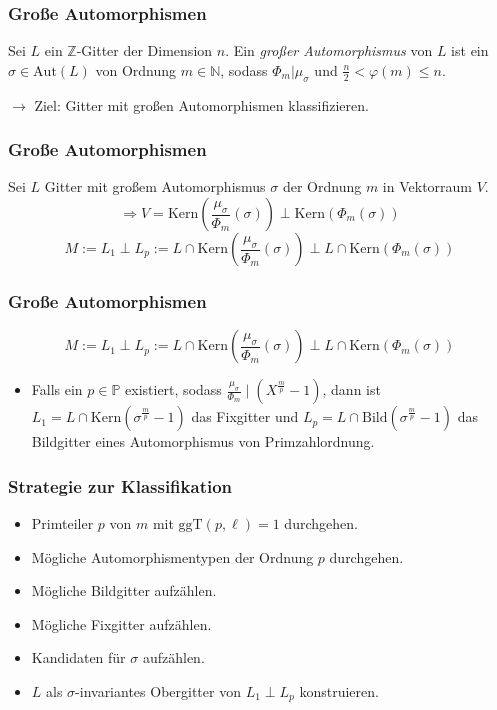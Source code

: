 \documentclass{beamer}
\newcommand{\N}{\mathbb{N}}
\newcommand{\Z}{\mathbb{Z}}
\renewcommand{\P}{\mathbb{P}}
\newcommand{\Kern}{\text{Kern}}
\newcommand{\Bild}{\text{Bild}}
\newcommand{\ggT}{\text{ggT}}
\newcommand{\Aut}{\text{Aut}}
\begin{document}
\begin{frame}[plain]
	\frametitle{Große Automorphismen}
	\begin{Definition}
		Sei $L$ ein $\Z$-Gitter der Dimension $n$. Ein \textit{großer Automorphismus} von $L$ ist ein $\sigma \in \Aut(L)$ von Ordnung $m \in \N$, sodass $\Phi_m \vert \mu_\sigma$ und $\frac{n}{2} < \varphi(m) \leq n$.
	\end{Definition}
	\pause
	\par
	$\rightarrow$ Ziel: Gitter mit großen Automorphismen klassifizieren.
\end{frame}

\begin{frame}[plain]
	\frametitle{Große Automorphismen}
	Sei $L$ Gitter mit großem Automorphismus $\sigma$ der Ordnung $m$ in Vektorraum $V$.
	\pause
	\[\Rightarrow V = \Kern(\frac{\mu_\sigma}{\Phi_m}(\sigma)) \perp \Kern(\Phi_m(\sigma))\]
	\[ M := L_1 \perp L_p := L \cap \Kern(\frac{\mu_\sigma}{\Phi_m}(\sigma)) \perp L \cap \Kern(\Phi_m(\sigma))\]
\end{frame}

\begin{frame}[plain]
	\frametitle{Große Automorphismen}
	\[ M := L_1 \perp L_p := L \cap \Kern(\frac{\mu_\sigma}{\Phi_m}(\sigma)) \perp L \cap \Kern(\Phi_m(\sigma))\]
	\begin{itemize}
		\item Falls ein $p \in \P$ existiert, sodass $\frac{\mu_\sigma}{\Phi_m} \mid (X^\frac{m}{p} - 1)$, dann ist $L_1 = L \cap \Kern(\sigma^\frac{m}{p}-1)$ das Fixgitter und $L_p = L \cap \Bild(\sigma^\frac{m}{p} - 1)$ das Bildgitter eines Automorphismus von Primzahlordnung.
	\end{itemize}
\end{frame}

\begin{frame}[plain]
	\frametitle{Strategie zur Klassifikation}
	\begin{itemize}
		\item Primteiler $p$ von $m$ mit $\ggT(p,\ell) = 1$ durchgehen.
		\pause
		\item Mögliche Automorphismentypen der Ordnung $p$ durchgehen.
		\pause
		\item Mögliche Bildgitter aufzählen.
		\pause
		\item Mögliche Fixgitter aufzählen.
		\pause
		\item Kandidaten für $\sigma$ aufzählen.
		\pause
		\item $L$ als $\sigma$-invariantes Obergitter von $L_1 \perp L_p$ konstruieren.
	\end{itemize}
\end{frame}
\end{document}
